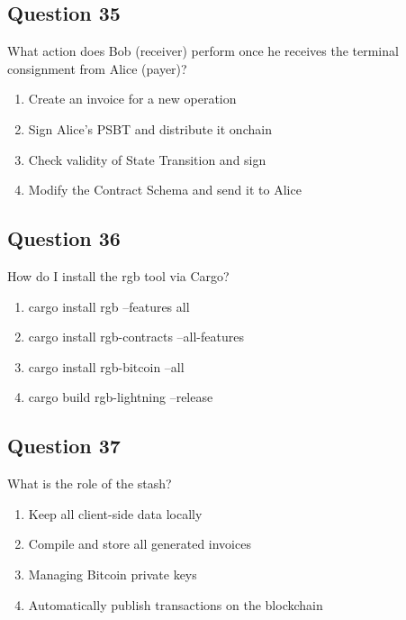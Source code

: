 \documentclass[12pt,a4paper]{article}
\begin{document}
\bigskip


\subsection*{Question 35}
What action does Bob (receiver) perform once he receives the terminal consignment from Alice (payer)?

\begin{enumerate}[label=\Alph*., leftmargin=*]
\item Create an invoice for a new operation
\item Sign Alice's PSBT and distribute it onchain
\item Check validity of State Transition and sign
\item Modify the Contract Schema and send it to Alice
\end{enumerate}

\bigskip


\subsection*{Question 36}
How do I install the rgb tool via Cargo?

\begin{enumerate}[label=\Alph*., leftmargin=*]
\item cargo install rgb --features all
\item cargo install rgb-contracts --all-features
\item cargo install rgb-bitcoin --all
\item cargo build rgb-lightning --release
\end{enumerate}

\bigskip


\subsection*{Question 37}
What is the role of the stash?

\begin{enumerate}[label=\Alph*., leftmargin=*]
\item Keep all client-side data locally
\item Compile and store all generated invoices
\item Managing Bitcoin private keys
\item Automatically publish transactions on the blockchain
\end{enumerate}

\bigskip
\end{document}
